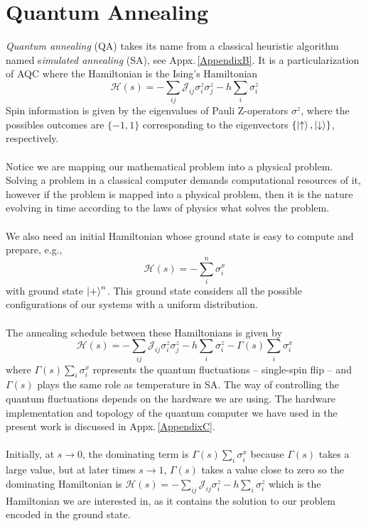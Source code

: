 \section{Quantum Annealing}
\textit{Quantum annealing} (QA) takes its name from a classical heuristic algorithm named s\textit{imulated annealing} (SA), see Appx.\,\ref{AppendixB}. It is a particularization of AQC where the Hamiltonian is the Ising's Hamiltonian
\begin{equation}
    \mathcal{H}(s) = -\sum_{ij}\mathcal{J}_{ij}\sigma_{i}^{z}\sigma_{j}^{z} - h\sum_{i}\sigma_{i}^{z}
\end{equation}
Spin information is given by the eigenvalues of Pauli Z-operators $\sigma^{z}$, where the possibles outcomes are $\{-1,1\}$ corresponding to the eigenvectors $\{\ket{\uparrow},\ket{\downarrow}\}$, respectively.\\\\
Notice we are mapping our mathematical problem into a physical problem. Solving a problem in a classical computer demands computational resources of it, however if the problem is mapped into a physical problem, then it is the nature evolving in time according to the laws of physics what solves the problem.\\\\
We also need an initial Hamiltonian whose ground state is easy to compute and prepare, e.g.,
\begin{equation}
    \mathcal{H}(s) = -\sum_{i}^{n}\sigma_{i}^{x}
\end{equation}
with ground state $\ket{+}^{n}$. This ground state considers all the possible configurations of our systems with a uniform distribution.\\\\
The annealing schedule between these Hamiltonians is given by
\begin{equation}
    \mathcal{H}(s) = -\sum_{ij}\mathcal{J}_{ij}\sigma_{i}^{z}\sigma_{j}^{z} - h\sum_{i}\sigma_{i}^{z} - \Gamma(s)\sum_{i}\sigma_{i}^{x}
\end{equation}
where $\Gamma(s)\sum_{i}\sigma_{i}^{x}$ represents the quantum fluctuations -- single-spin flip -- and $\Gamma(s)$ plays the same role as temperature in SA. The way of controlling the quantum fluctuations depends on the hardware we are using. The hardware implementation and topology of the quantum computer we have used in the present work is discussed in Appx.\,\ref{AppendixC}.\\\\
Initially, at $s \rightarrow 0$, the dominating term is $\Gamma(s)\sum_{i}\sigma_{i}^{x}$ because $\Gamma(s)$ takes a large value, but at later times $s \rightarrow 1$, $\Gamma(s)$ takes a value close to zero so the dominating Hamiltonian is $\mathcal{H}(s) = -\sum_{ij}\mathcal{J}_{ij}\sigma_{i}^{z} - h\sum_{i}\sigma_{i}^{z}$ which is the Hamiltonian we are interested in, as it contains the solution to our problem encoded in the ground state.

